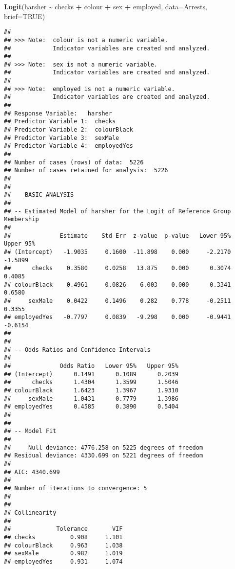 \documentclass[
]{book}
\newenvironment{Shaded}{\begin{snugshade}}{\end{snugshade}}
\newcommand{\AttributeTok}[1]{\textcolor[rgb]{0.13,0.29,0.53}{#1}}
\newcommand{\ConstantTok}[1]{\textcolor[rgb]{0.56,0.35,0.01}{#1}}
\newcommand{\FunctionTok}[1]{\textcolor[rgb]{0.13,0.29,0.53}{\textbf{#1}}}
\newcommand{\NormalTok}[1]{#1}
\newcommand{\SpecialCharTok}[1]{\textcolor[rgb]{0.81,0.36,0.00}{\textbf{#1}}}
\begin{document}
\begin{Shaded}
\begin{Highlighting}[]
\FunctionTok{Logit}\NormalTok{(harsher }\SpecialCharTok{\textasciitilde{}}\NormalTok{ checks }\SpecialCharTok{+}\NormalTok{ colour }\SpecialCharTok{+}\NormalTok{ sex }\SpecialCharTok{+}\NormalTok{ employed, }\AttributeTok{data=}\NormalTok{Arrests, }\AttributeTok{brief=}\ConstantTok{TRUE}\NormalTok{)}
\end{Highlighting}
\end{Shaded}

\begin{verbatim}
## 
## >>> Note:  colour is not a numeric variable.
##            Indicator variables are created and analyzed.
## 
## >>> Note:  sex is not a numeric variable.
##            Indicator variables are created and analyzed.
## 
## >>> Note:  employed is not a numeric variable.
##            Indicator variables are created and analyzed.
## 
## Response Variable:   harsher
## Predictor Variable 1:  checks
## Predictor Variable 2:  colourBlack
## Predictor Variable 3:  sexMale
## Predictor Variable 4:  employedYes
## 
## Number of cases (rows) of data:  5226 
## Number of cases retained for analysis:  5226 
## 
## 
##    BASIC ANALYSIS 
## 
## -- Estimated Model of harsher for the Logit of Reference Group Membership
## 
##              Estimate    Std Err  z-value  p-value   Lower 95%   Upper 95%
## (Intercept)   -1.9035     0.1600  -11.898    0.000     -2.2170     -1.5899 
##      checks    0.3580     0.0258   13.875    0.000      0.3074      0.4085 
## colourBlack    0.4961     0.0826    6.003    0.000      0.3341      0.6580 
##     sexMale    0.0422     0.1496    0.282    0.778     -0.2511      0.3355 
## employedYes   -0.7797     0.0839   -9.298    0.000     -0.9441     -0.6154 
## 
## 
## -- Odds Ratios and Confidence Intervals
## 
##              Odds Ratio   Lower 95%   Upper 95%
## (Intercept)      0.1491      0.1089      0.2039 
##      checks      1.4304      1.3599      1.5046 
## colourBlack      1.6423      1.3967      1.9310 
##     sexMale      1.0431      0.7779      1.3986 
## employedYes      0.4585      0.3890      0.5404 
## 
## 
## -- Model Fit
## 
##     Null deviance: 4776.258 on 5225 degrees of freedom
## Residual deviance: 4330.699 on 5221 degrees of freedom
## 
## AIC: 4340.699 
## 
## Number of iterations to convergence: 5 
## 
## 
## Collinearity
## 
##             Tolerance       VIF
## checks          0.908     1.101
## colourBlack     0.963     1.038
## sexMale         0.982     1.019
## employedYes     0.931     1.074
\end{verbatim}
\end{document}
